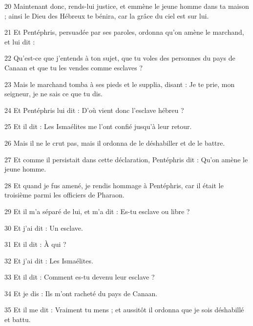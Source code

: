 \par 20 Maintenant donc, rends-lui justice, et emmène le jeune homme dans ta maison ; ainsi le Dieu des Hébreux te bénira, car la grâce du ciel est sur lui.

\par 21 Et Pentéphris, persuadée par ses paroles, ordonna qu'on amène le marchand, et lui dit :

\par 22 Qu'est-ce que j'entends à ton sujet, que tu voles des personnes du pays de Canaan et que tu les vendes comme esclaves ?

\par 23 Mais le marchand tomba à ses pieds et le supplia, disant : Je te prie, mon seigneur, je ne sais ce que tu dis.

\par 24 Et Pentéphris lui dit : D'où vient donc l'esclave hébreu ?

\par 25 Et il dit : Les Ismaélites me l'ont confié jusqu'à leur retour.

\par 26 Mais il ne le crut pas, mais il ordonna de le déshabiller et de le battre.

\par 27 Et comme il persistait dans cette déclaration, Pentéphris dit : Qu'on amène le jeune homme.

\par 28 Et quand je fus amené, je rendis hommage à Pentéphris, car il était le troisième parmi les officiers de Pharaon.

\par 29 Et il m'a séparé de lui, et m'a dit : Es-tu esclave ou libre ?

\par 30 Et j'ai dit : Un esclave.

\par 31 Et il dit : À qui ?

\par 32 Et j'ai dit : Les Ismaélites.

\par 33 Et il dit : Comment es-tu devenu leur esclave ?

\par 34 Et je dis : Ils m'ont racheté du pays de Canaan.

\par 35 Et il me dit : Vraiment tu mens ; et aussitôt il ordonna que je sois déshabillé et battu.

